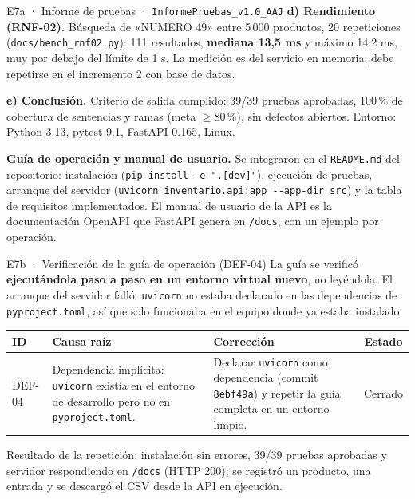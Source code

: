 \documentclass[11pt,a4paper]{article}
\newcommand{\cod}[1]{\texttt{\small #1}}
\begin{document}
\begin{evidencia}{E7a · Informe de pruebas · \cod{InformePruebas\_v1.0\_AAJ}}
\textbf{d) Rendimiento (RNF-02).} Búsqueda de «NUMERO 49» entre 5\,000 productos, 20 repeticiones (\cod{docs/bench\_rnf02.py}): 111 resultados, \textbf{mediana 13,5 ms} y máximo 14,2 ms, muy por debajo del límite de 1 s. La medición es del servicio en memoria; debe repetirse en el incremento 2 con base de datos.

\vspace{0.2cm}
\textbf{e) Conclusión.} Criterio de salida cumplido: 39/39 pruebas aprobadas, 100\,\% de cobertura de sentencias y ramas (meta $\geq 80$\,\%), sin defectos abiertos. Entorno: Python 3.13, pytest 9.1, FastAPI 0.165, Linux.
\end{evidencia}

\noindent\textbf{Guía de operación y manual de usuario.} Se integraron en el \cod{README.md} del repositorio: instalación (\cod{pip install -e ".[dev]"}), ejecución de pruebas, arranque del servidor (\cod{uvicorn inventario.api:app -{}-app-dir src}) y la tabla de requisitos implementados. El manual de usuario de la API es la documentación OpenAPI que FastAPI genera en \cod{/docs}, con un ejemplo por operación.

\begin{evidencia}{E7b · Verificación de la guía de operación (DEF-04)}
\small
La guía se verificó \textbf{ejecutándola paso a paso en un entorno virtual nuevo}, no leyéndola. El arranque del servidor falló: \cod{uvicorn} no estaba declarado en las dependencias de \cod{pyproject.toml}, así que solo funcionaba en el equipo donde ya estaba instalado.

\vspace{0.2cm}
\begin{tabularx}{\linewidth}{@{}l L L c@{}}
\toprule
\textbf{ID} & \textbf{Causa raíz} & \textbf{Corrección} & \textbf{Estado} \\
\midrule
DEF-04 & Dependencia implícita: \cod{uvicorn} existía en el entorno de desarrollo pero no en \cod{pyproject.toml}. & Declarar \cod{uvicorn} como dependencia (commit \cod{8ebf49a}) y repetir la guía completa en un entorno limpio. & Cerrado \\
\bottomrule
\end{tabularx}

\vspace{0.2cm}
Resultado de la repetición: instalación sin errores, 39/39 pruebas aprobadas y servidor respondiendo en \cod{/docs} (HTTP 200); se registró un producto, una entrada y se descargó el CSV desde la API en ejecución.
\end{evidencia}
\end{document}
